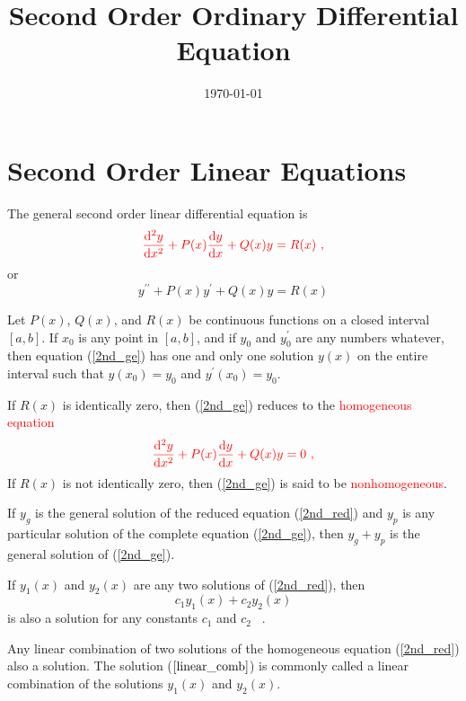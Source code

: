 \documentclass[11pt,a4paper]{article}
\title{Second Order Ordinary Differential Equation}
\author{}
\date{\today}
\newcommand{\dif}{\mathrm{d}}
\begin{document}
\maketitle














\section{Second Order Linear Equations}
The general second order linear differential equation is
\begin{equation}
\color{red} \frac{\dif^2 y}{\dif x^2} +P(x) \frac{\dif y}{\dif x} +Q(x)y = R(x) ~,
\label{2nd_ge}
\end{equation}
or
\begin{equation}
y^{\prime\prime} +P(x) y^\prime +Q(x) y = R(x)
\end{equation}

\begin{tcolorbox}[colback=green!15,colframe=green!40!black,title=Theorem A]
Let $P(x)$, $Q(x)$, and $R(x)$ be continuous functions on a closed interval $[a,b]$. If $x_0$ is any point in $[a,b]$, and if $y_0$ and $y^\prime_0$ are any numbers whatever, then equation (\ref{2nd_ge}) has one and only one solution $y(x)$ on the entire interval such that $y(x_0) = y_0$ and $y^\prime(x_0) = y_0$.
\end{tcolorbox}

If $R(x)$ is identically zero, then (\ref{2nd_ge}) reduces to the \textcolor{red}{homogeneous equation}
\begin{equation}
\color{red} \frac{\dif^2 y}{\dif x^2} +P(x) \frac{\dif y}{\dif x} +Q(x)y = 0 ~,
\label{2nd_red}
\end{equation}
If $R(x)$ is not identically zero, then (\ref{2nd_ge}) is said to be \textcolor{red}{nonhomogeneous}.


\begin{tcolorbox}[colback=green!15,colframe=green!40!black,title=Theorem B]
If $y_g$ is the general solution of the reduced equation (\ref{2nd_red}) and $y_p$ is any particular solution of the complete equation (\ref{2nd_ge}), then $y_g + y_p$ is the general solution of (\ref{2nd_ge}).
\end{tcolorbox}



\begin{tcolorbox}[colback=green!15,colframe=green!40!black,title=Theorem C]
If $y_1(x)$ and $y_2(x)$ are any two solutions of (\ref{2nd_red}), then
\begin{equation}
c_1 y_1(x) + c_2 y_2(x)
\label{linear_comb}
\end{equation}
is also a solution for any constants $c_1$ and $c_2$ ~.
\end{tcolorbox}
Any linear combination of two solutions of the homogeneous equation (\ref{2nd_red}) also a solution. The solution ($\ref{linear_comb}$) is commonly called a linear combination of the solutions $y_1(x)$ and $y_2(x)$. 
\end{document}
